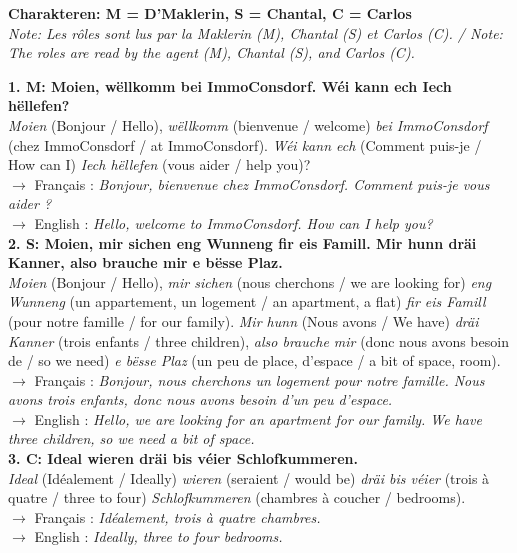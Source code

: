 \noindent\textbf{Charakteren: M = D'Maklerin, S = Chantal, C = Carlos} \\
\textit{Note: Les rôles sont lus par la Maklerin (M), Chantal (S) et Carlos (C). / Note: The roles are read by the agent (M), Chantal (S), and Carlos (C).}

\vspace{1.5em}

\noindent\textbf{1. M: Moien, wëllkomm bei ImmoConsdorf. Wéi kann ech Iech hëllefen?}\\
\textit{Moien} (Bonjour / Hello), \textit{wëllkomm} (bienvenue / welcome) \textit{bei ImmoConsdorf} (chez ImmoConsdorf / at ImmoConsdorf). \textit{Wéi kann ech} (Comment puis-je / How can I) \textit{Iech hëllefen} (vous aider / help you)?\\
$\rightarrow$ Français : \textit{Bonjour, bienvenue chez ImmoConsdorf. Comment puis-je vous aider ?}\\
$\rightarrow$ English : \textit{Hello, welcome to ImmoConsdorf. How can I help you?}\\[0.5em]

\noindent\textbf{2. S: Moien, mir sichen eng Wunneng fir eis Famill. Mir hunn dräi Kanner, also brauche mir e bësse Plaz.}\\
\textit{Moien} (Bonjour / Hello), \textit{mir sichen} (nous cherchons / we are looking for) \textit{eng Wunneng} (un appartement, un logement / an apartment, a flat) \textit{fir eis Famill} (pour notre famille / for our family). \textit{Mir hunn} (Nous avons / We have) \textit{dräi Kanner} (trois enfants / three children), \textit{also brauche mir} (donc nous avons besoin de / so we need) \textit{e bësse Plaz} (un peu de place, d'espace / a bit of space, room).\\
$\rightarrow$ Français : \textit{Bonjour, nous cherchons un logement pour notre famille. Nous avons trois enfants, donc nous avons besoin d'un peu d'espace.}\\
$\rightarrow$ English : \textit{Hello, we are looking for an apartment for our family. We have three children, so we need a bit of space.}\\[0.5em]

\noindent\textbf{3. C: Ideal wieren dräi bis véier Schlofkummeren.}\\
\textit{Ideal} (Idéalement / Ideally) \textit{wieren} (seraient / would be) \textit{dräi bis véier} (trois à quatre / three to four) \textit{Schlofkummeren} (chambres à coucher / bedrooms).\\
$\rightarrow$ Français : \textit{Idéalement, trois à quatre chambres.}\\
$\rightarrow$ English : \textit{Ideally, three to four bedrooms.}\\[0.5em]

